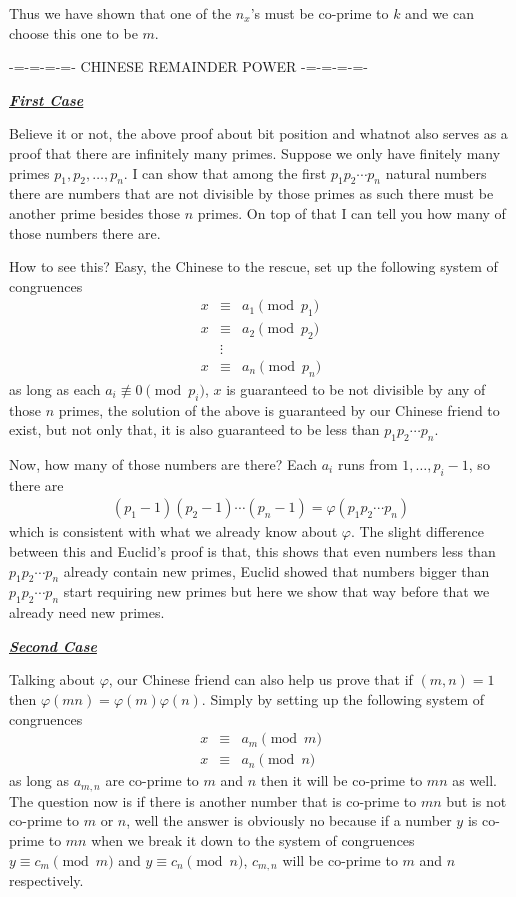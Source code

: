\documentclass[aps,preprint,preprintnumbers,nofootinbib,showpacs,prd]{revtex4-1}
\newcommand{\nbea}{\begin{eqnarray*}}
\newcommand{\neea}{\end{eqnarray*}}
\begin{document}
Thus we have shown that one of the $n_x$'s must be co-prime to $k$ and we can choose this one to be $m$.

-=-=-=-=- CHINESE REMAINDER POWER -=-=-=-=-

\underline{\textit{\textbf{First Case}}}

Believe it or not, the above proof about bit position and whatnot also serves as a proof that there are infinitely many primes. Suppose we only have finitely many primes $p_1,p_2, \dots, p_n$. I can show that among the first $p_1p_2 \cdots p_n$ natural numbers there are numbers that are not divisible by those primes as such there must be another prime besides those $n$ primes. On top of that I can tell you how many of those numbers there are.

How to see this? Easy, the Chinese to the rescue, set up the following system of congruences
%
\nbea
x & \equiv & a_1 \pmod{p_1} \\
x & \equiv & a_2 \pmod{p_2} \\
& \vdots & \\
x & \equiv & a_n \pmod{p_n}
\neea
%
as long as each $a_i \not\equiv 0 \pmod{p_i}$, $x$ is guaranteed to be not divisible by any of those $n$ primes, the solution of the above is guaranteed by our Chinese friend to exist, but not only that, it is also guaranteed to be less than $p_1p_2 \cdots p_n$.

Now, how many of those numbers are there? Each $a_i$ runs from $1,\dots,p_i-1$, so there are
%
\nbea
(p_1 - 1)(p_2 - 1) \cdots (p_n - 1) = \varphi(p_1p_2\cdots p_n)
\neea
%
which is consistent with what we already know about $\varphi$. The slight difference between this and Euclid's proof is that, this shows that even numbers less than $p_1p_2 \cdots p_n$ already contain new primes, Euclid showed that numbers bigger than $p_1p_2 \cdots p_n$ start requiring new primes but here we show that way before that we already need new primes.

\underline{\textit{\textbf{Second Case}}}

Talking about $\varphi$, our Chinese friend can also help us prove that if $(m,n)=1$ then $\varphi(mn) = \varphi(m)\varphi(n)$. Simply by setting up the following system of congruences
%
\nbea
x & \equiv & a_m \pmod{m} \\
x & \equiv & a_n \pmod{n}
\neea
%
as long as $a_{m,n}$ are co-prime to $m$ and $n$ then it will be co-prime to $mn$ as well. The question now is if there is another number that is co-prime to $mn$ but is not co-prime to $m$ or $n$, well the answer is obviously no because if a number $y$ is co-prime to $mn$ when we break it down to the system of congruences $y \equiv c_m \pmod{m}$ and $y \equiv c_n \pmod{n}$, $c_{m,n}$ will be co-prime to $m$ and $n$ respectively.
\end{document}
